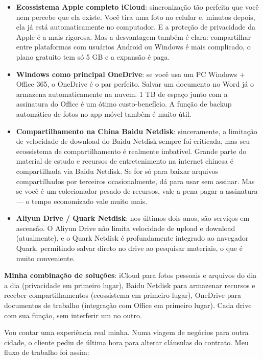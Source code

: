 \begin{itemize}
  \item \textbf{Ecossistema Apple completo iCloud}: sincronização tão perfeita que você nem percebe que ela existe. Você tira uma foto no celular e, minutos depois, ela já está automaticamente no computador. E a proteção de privacidade da Apple é a mais rigorosa. Mas a desvantagem também é clara: compartilhar entre plataformas com usuários Android ou Windows é mais complicado, o plano gratuito tem só 5 GB e a expansão é paga.
  \item \textbf{Windows como principal OneDrive}: se você usa um PC Windows + Office 365, o OneDrive é o par perfeito. Salvar um documento no Word já o armazena automaticamente na nuvem. 1 TB de espaço junto com a assinatura do Office é um ótimo custo-benefício. A função de backup automático de fotos no app móvel também é muito útil.
  \item \textbf{Compartilhamento na China Baidu Netdisk}: sinceramente, a limitação de velocidade de download do Baidu Netdisk sempre foi criticada, mas seu ecossistema de compartilhamento é realmente imbatível. Grande parte do material de estudo e recursos de entretenimento na internet chinesa é compartilhada via Baidu Netdisk. Se for só para baixar arquivos compartilhados por terceiros ocasionalmente, dá para usar sem assinar. Mas se você é um colecionador pesado de recursos, vale a pena pagar a assinatura — o tempo economizado vale muito mais.
  \item \textbf{Aliyun Drive / Quark Netdisk}: nos últimos dois anos, são serviços em ascensão. O Aliyun Drive não limita velocidade de upload e download (atualmente), e o Quark Netdisk é profundamente integrado ao navegador Quark, permitindo salvar direto no drive ao pesquisar materiais, o que é muito conveniente.
\end{itemize}

\textbf{Minha combinação de soluções}: iCloud para fotos pessoais e arquivos do dia a dia (privacidade em primeiro lugar), Baidu Netdisk para armazenar recursos e receber compartilhamentos (ecossistema em primeiro lugar), OneDrive para documentos de trabalho (integração com Office em primeiro lugar). Cada drive com sua função, sem interferir um no outro.


Vou contar uma experiência real minha. Numa viagem de negócios para outra cidade, o cliente pediu de última hora para alterar cláusulas do contrato. Meu fluxo de trabalho foi assim:


